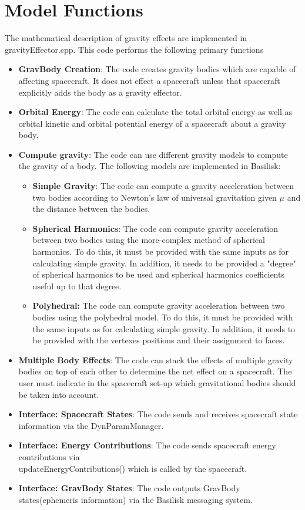 \section{Model Functions}
The mathematical description of gravity effects are implemented in gravityEffector.cpp. This code performs the following primary functions
\begin{itemize}
	\item \textbf{GravBody Creation}: The code creates gravity bodies which are capable of affecting spacecraft. It does not effect a spacecraft unless that spacecraft explicitly adds the body as a gravity effector.
	\item \textbf{Orbital Energy}: The code can calculate the total orbital energy as well as orbital kinetic and orbital potential energy of a spacecraft about a gravity body.
	\item \textbf{Compute gravity}: The code can use different gravity models to compute the gravity of a body. The following models are implemented in Basilisk:
	\begin{itemize}
		\item \textbf{Simple Gravity}: The code can compute a gravity acceleration between two bodies according to Newton's law of universal gravitation given $\mu$ and the distance between the bodies.
		\item \textbf{Spherical Harmonics}: The code can compute gravity acceleration between two bodies using the more-complex method of spherical harmonics. To do this, it must be provided with the same inputs as for calculating simple gravity. In addition, it needs to be provided a "degree" of spherical harmonics to be used and spherical harmonics coefficients useful up to that degree.
		\item \textbf{Polyhedral:} The code can compute gravity acceleration between two bodies using the polyhedral model. To do this, it must be provided with the same inputs as for calculating simple gravity. In addition, it needs to be provided with the vertexes positions and their assignment to faces. 
	\end{itemize}
	\item \textbf{Multiple Body Effects}: The code can stack the effects of multiple gravity bodies on top of each other to determine the net effect on a spacecraft. The user must indicate in the spacecraft set-up which gravitational bodies should be taken into account.
	\item \textbf{Interface: Spacecraft States}: The code sends and receives spacecraft state information via the DynParamManager.
	\item \textbf{Interface: Energy Contributions}: The code sends spacecraft energy contributions via \\updateEnergyContributions() which is called by the spacecraft.
	\item \textbf{Interface: GravBody States}: The code outputs GravBody states(ephemeris information) via the Basilisk messaging system.
	
\end{itemize}


